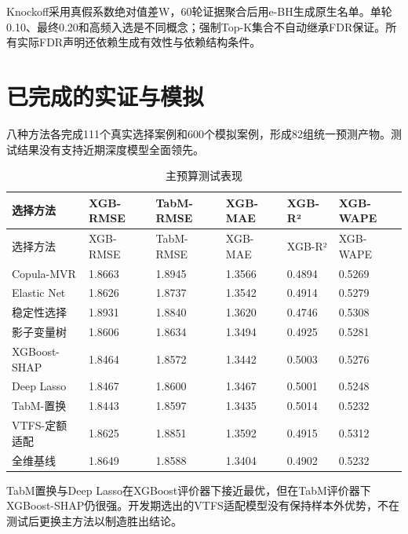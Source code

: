 \documentclass[UTF8,12pt,a4paper]{ctexart}
\begin{document}
Knockoff采用真假系数绝对值差W，60轮证据聚合后用e-BH生成原生名单。单轮0.10、最终0.20和高频入选是不同概念；强制Top-K集合不自动继承FDR保证。所有实际FDR声明还依赖生成有效性与依赖结构条件。

\section{已完成的实证与模拟}

八种方法各完成111个真实选择案例和600个模拟案例，形成82组统一预测产物。测试结果没有支持近期深度模型全面领先。

{
\footnotesize
\begin{longtable}[]{@{}llllll@{}}
\caption{主预算测试表现}\tabularnewline
\toprule\noalign{}
选择方法 & XGB-RMSE & TabM-RMSE & XGB-MAE & XGB-R² & XGB-WAPE \\
\midrule\noalign{}
\endfirsthead
\toprule\noalign{}
选择方法 & XGB-RMSE & TabM-RMSE & XGB-MAE & XGB-R² & XGB-WAPE \\
\midrule\noalign{}
\endhead
\bottomrule\noalign{}
\endlastfoot
Copula-MVR & 1.8663 & 1.8945 & 1.3566 & 0.4894 & 0.5269 \\
Elastic Net & 1.8626 & 1.8737 & 1.3542 & 0.4914 & 0.5279 \\
稳定性选择 & 1.8931 & 1.8840 & 1.3620 & 0.4746 & 0.5308 \\
影子变量树 & 1.8606 & 1.8634 & 1.3494 & 0.4925 & 0.5281 \\
XGBoost-SHAP & 1.8464 & 1.8572 & 1.3442 & 0.5003 & 0.5276 \\
Deep Lasso & 1.8467 & 1.8600 & 1.3467 & 0.5001 & 0.5248 \\
TabM-置换 & 1.8443 & 1.8597 & 1.3435 & 0.5014 & 0.5232 \\
VTFS-定额适配 & 1.8625 & 1.8851 & 1.3592 & 0.4915 & 0.5312 \\
全维基线 & 1.8649 & 1.8588 & 1.3404 & 0.4902 & 0.5232 \\
\end{longtable}
}

TabM置换与Deep Lasso在XGBoost评价器下接近最优，但在TabM评价器下XGBoost-SHAP仍很强。开发期选出的VTFS适配模型没有保持样本外优势，不在测试后更换主方法以制造胜出结论。
\end{document}
